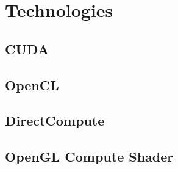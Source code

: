 \chapter{Technologies}



\section{CUDA}

\section{OpenCL}

\section{DirectCompute}

\section{OpenGL Compute Shader}